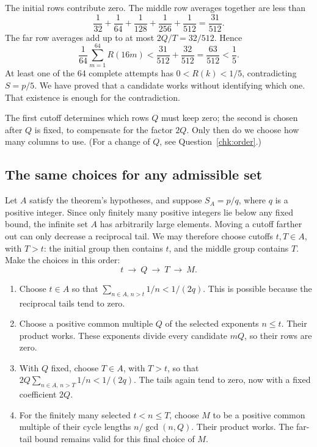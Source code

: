\documentclass[10pt]{article}
\theoremstyle{plain}
\theoremstyle{definition}
\theoremstyle{remark}
\begin{document}
The initial rows contribute zero. The middle row averages together are
less than
\[
 \frac1{32}+\frac1{64}+\frac1{128}+\frac1{256}+\frac1{512}
 =\frac{31}{512}.
\]
The far row averages add up to at most $2Q/T=32/512$. Hence
\[
 \frac1{64}\sum_{m=1}^{64}R(16m)
 <\frac{31}{512}+\frac{32}{512}=\frac{63}{512}<\frac15.
\]
At least one of the 64 complete attempts has $0<R(k)<1/5$, contradicting
$S=p/5$. We have proved that a candidate works without identifying which
one. That existence is enough for the contradiction.

The first cutoff determines which rows $Q$ must keep zero; the second is
chosen after $Q$ is fixed, to compensate for the factor $2Q$.
Only then do we choose how many columns to use.
(For a change of $Q$, see Question~\ref{chk:order}.)

\begin{samepage}
\subsection{The same choices for any admissible set}\label{sec:allchoices}

Let $A$ satisfy the theorem's hypotheses, and suppose $S_A=p/q$, where
$q$ is a positive integer. Since only finitely many positive integers lie
below any fixed bound, the infinite set $A$ has arbitrarily large elements.
Moving a cutoff farther out can only decrease a reciprocal tail. We may
therefore choose cutoffs $t,T\in A$, with $T>t$: the initial group then
contains $t$, and the middle group contains $T$.
Make the choices in this order:
\[
 t\ \longrightarrow\ Q\ \longrightarrow\ T\ \longrightarrow\ M.
\]
\begin{enumerate}
\item Choose $t\in A$ so that
 $\sum_{n\in A,\,n>t}1/n<1/(2q)$.
 This is possible because the reciprocal tails tend to zero.
\item Choose a positive common multiple $Q$ of the selected exponents
 $n\le t$. Their product works.
 These exponents divide every candidate $mQ$, so their rows are zero.
\item With $Q$ fixed, choose $T\in A$, with $T>t$, so that
 $2Q\sum_{n\in A,\,n>T}1/n<1/(2q)$.
 The tails again tend to zero, now with a fixed coefficient $2Q$.
\item For the finitely many selected $t<n\le T$, choose $M$ to be a
 positive common multiple of their cycle lengths $n/\gcd(n,Q)$.
 Their product works.
 The far-tail bound remains valid for this final choice of $M$.
\end{enumerate}
\end{samepage}
\end{document}
